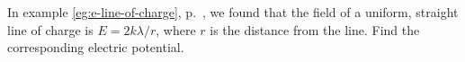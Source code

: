In example \ref{eg:e-line-of-charge}, p.~\pageref{eg:e-line-of-charge},
we found that the field of a uniform, straight line of charge is
$E=2k\lambda/r$, where $r$ is the distance from the line.
Find the corresponding electric potential.\answercheck
